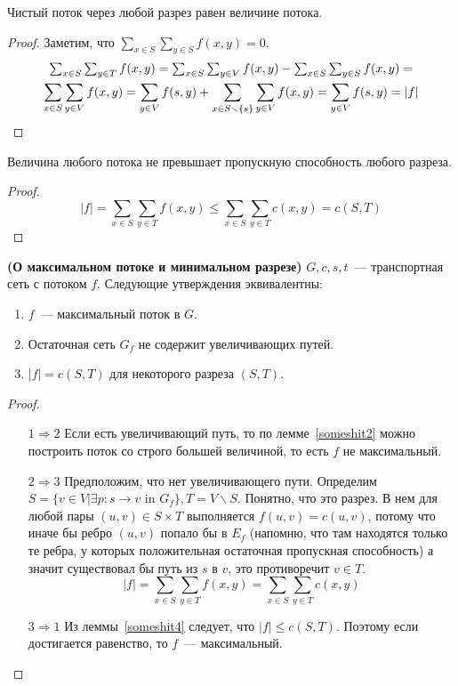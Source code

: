 \begin{lemma}\label{someshit3}
	Чистый поток через любой разрез равен величине потока.
\end{lemma}
\begin{proof}
	Заметим, что $\sum_{x\in S}\sum_{y\in S}f(x,y)=0$.
	\begin{multline*}
	$$
	\sum_{x\in S}\sum_{y\in T}f(x,y)=\sum_{x\in S}\sum_{y\in V}f(x,y)-\sum_{x\in S}\sum_{y\in S}f(x,y)=\\
	\sum_{x\in S}\sum_{y\in V}f(x,y)=\sum_{y\in V}f(s,y)+\sum_{x\in S\smallsetminus \{s\}}\sum_{y\in V}f(x,y)=\sum_{y\in V}f(s,y)=|f|
	$$
	\end{multline*}
\end{proof}
\begin{lemma}\label{someshit4}
	Величина любого потока не превышает пропускную способность любого разреза.
\end{lemma}
\begin{proof}
	$$
	|f|=\sum_{x\in S}\sum_{y\in T}f(x,y)\le\sum_{x\in S}\sum_{y\in T}c(x,y)=c(S,T)
	$$
\end{proof}
\begin{theorem} {\bf (О максимальном потоке и минимальном разрезе)}\label{maxflowmincut}
	$G,c,s,t$~--- транспортная сеть с потоком $f$. Следующие утверждения эквивалентны:
	\begin{enumerate}
		\item $f$~--- максимальный поток в $G$.
		\item Остаточная сеть $G_f$ не содержит увеличивающих путей.
		\item $|f|=c(S,T)$ для некоторого разреза $(S,T)$.
	\end{enumerate}
\end{theorem}
\begin{proof}$ $\newline %
	\begin{itemize}
		\item[$\mathrm{1}\Rightarrow\mathrm{2}$] Если есть увеличивающий путь, то по лемме~\ref{someshit2} можно построить поток со строго большей величиной, то есть $f$ не максимальный.
		\item[$\mathrm{2}\Rightarrow\mathrm{3}$] Предположим, что нет увеличивающего пути. Определим $S=\{v\in V|\exists p\colon s\to v\textrm{ in }G_f\}, T=V\smallsetminus S$. Понятно, что это разрез. В нем для любой пары $(u,v)\in S\times T$ выполняется $f(u,v)=c(u,v)$, потому что иначе бы ребро $(u,v)$ попало бы в $E_f$ (напомню, что там находятся только те ребра, у которых положительная остаточная пропускная способность) а значит существовал бы путь из $s$ в $v$, это противоречит $v\in T$. $$|f|=\sum_{x\in S}\sum_{y\in T}f(x,y)=\sum_{x\in S}\sum_{y\in T}c(x,y)$$
		\item[$\mathrm{3}\Rightarrow\mathrm{1}$] Из леммы~\ref{someshit4} следует, что $|f|\le c(S,T)$. Поэтому если достигается равенство, то $f$~--- максимальный.
	\end{itemize}
\end{proof}

